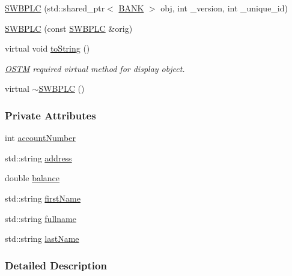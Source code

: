 \begin{DoxyCompactItemize}
\item 
\hyperlink{class_s_w_b_p_l_c_a33e460bff6f51b30209a6f5a25a24d7d_a33e460bff6f51b30209a6f5a25a24d7d}{S\+W\+B\+P\+LC} (std\+::shared\+\_\+ptr$<$ \hyperlink{class_b_a_n_k}{B\+A\+NK} $>$ obj, int \+\_\+version, int \+\_\+unique\+\_\+id)
\item 
\hyperlink{class_s_w_b_p_l_c_a767c6ae2b15f523b5ec6e35e137dcc96_a767c6ae2b15f523b5ec6e35e137dcc96}{S\+W\+B\+P\+LC} (const \hyperlink{class_s_w_b_p_l_c}{S\+W\+B\+P\+LC} \&orig)
\item 
virtual void \hyperlink{class_s_w_b_p_l_c_a761c77b5a204b4ae05ffb01bd602c3c2_a761c77b5a204b4ae05ffb01bd602c3c2}{to\+String} ()
\begin{DoxyCompactList}\small\item\em \hyperlink{class_o_s_t_m}{O\+S\+TM} required virtual method for display object. \end{DoxyCompactList}\item 
virtual \hyperlink{class_s_w_b_p_l_c_a5d6f00a76145f32424ff6db9ac23c6fe_a5d6f00a76145f32424ff6db9ac23c6fe}{$\sim$\+S\+W\+B\+P\+LC} ()
\end{DoxyCompactItemize}
\subsubsection*{Private Attributes}
\begin{DoxyCompactItemize}
\item 
int \hyperlink{class_s_w_b_p_l_c_a5d03f989254b88bdb7eb3deeec7e4217_a5d03f989254b88bdb7eb3deeec7e4217}{account\+Number}
\item 
std\+::string \hyperlink{class_s_w_b_p_l_c_a86edad3cbbc5903c8ab8a45b22c0dd15_a86edad3cbbc5903c8ab8a45b22c0dd15}{address}
\item 
double \hyperlink{class_s_w_b_p_l_c_a34365efdc6dde37a4da9a6222dcde389_a34365efdc6dde37a4da9a6222dcde389}{balance}
\item 
std\+::string \hyperlink{class_s_w_b_p_l_c_a38fd4817afe4aaac4993b0b4c7074b9c_a38fd4817afe4aaac4993b0b4c7074b9c}{first\+Name}
\item 
std\+::string \hyperlink{class_s_w_b_p_l_c_a5de90ba5cac0107fa5361458a0df839e_a5de90ba5cac0107fa5361458a0df839e}{fullname}
\item 
std\+::string \hyperlink{class_s_w_b_p_l_c_aa06b2e569dd1fef8e43dfda1b34d67f3_aa06b2e569dd1fef8e43dfda1b34d67f3}{last\+Name}
\end{DoxyCompactItemize}


\subsubsection{Detailed Description}


